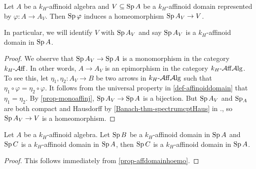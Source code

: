 \begin{proposition}\label{prop-affdomainhoemo}
    Let $A$ be a $k_H$-affinoid algebra and $V\subseteq \operatorname{Sp} A$ be a $k_H$-affinoid domain represented by $\varphi:A\rightarrow A_V$. Then $\operatorname{Sp} \varphi$ induces a homeomorphism $\operatorname{Sp} A_V\rightarrow V$. 
\end{proposition}
In particular, we will identify $V$ with $\operatorname{Sp} A_V$ and say $\operatorname{Sp} A_V$ is a $k_H$-affinoid domain in $\operatorname{Sp} A$.
\begin{proof}
    We observe that $\operatorname{Sp} A_V\rightarrow \operatorname{Sp} A$ is a monomorphism in the category $k_H\text{-}\mathcal{A}\mathrm{ff}$. In other words, $A\rightarrow A_V$ is an epimorphism in the category $k_H\text{-}\mathcal{A}\mathrm{ff}\mathcal{A}\mathrm{lg}$. To see this, let $\eta_1,\eta_2:A_V\rightarrow B$ be two arrows in $k_H\text{-}\mathcal{A}\mathrm{ff}\mathcal{A}\mathrm{lg}$ such that $\eta_1\circ \varphi=\eta_2\circ \varphi$. It follows from the universal property in \cref{def-affinoiddomain} that $\eta_1=\eta_2$. By \cref{prop-monoaffinj}, $\operatorname{Sp} A_V\rightarrow \operatorname{Sp} A$ is a bijection. But $\operatorname{Sp} A_V$ and $\operatorname{Sp}_A$ are both compact and Hausdorff by \cref{Banach-thm-spectrumcptHaus} in ., so $\operatorname{Sp} A_V\rightarrow V$ is a homeomorphism.
\end{proof}


\begin{corollary}\label{cor-affinoiddomaintransi}
    Let $A$ be a $k_H$-affinoid algebra. Let $\operatorname{Sp} B$ be a $k_H$-affinoid domain in $\operatorname{Sp} A$ and $\operatorname{Sp} C$ is a $k_H$-affinoid domain in $\operatorname{Sp} A$, then $\operatorname{Sp} C$ is a $k_H$-affinoid domain in $\operatorname{Sp} A$.
\end{corollary}
\begin{proof}
    This follows immediately from \cref{prop-affdomainhoemo}.
\end{proof}

